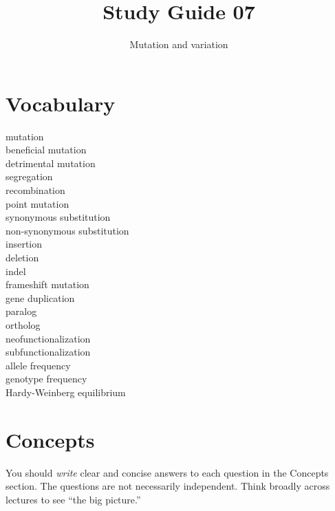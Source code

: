 \documentclass[letterpaper]{tufte-handout}
\title{Study Guide 07\hfill}
\author{Mutation and variation}
\date{} %
\begin{document}
\maketitle	%

\section{Vocabulary}

\begin{multicols}{2}
mutation \\
beneficial mutation \\
detrimental mutation \\
segregation \\
recombination \\
point mutation \\
synonymous substitution \\
non-synonymous substitution \\
insertion \\
deletion \\
indel \\
frameshift mutation \\
gene duplication \\
paralog \\
ortholog \\
neofunctionalization \\
subfunctionalization \\
allele frequency \\
genotype frequency \\
Hardy-Weinberg equilibrium 
\end{multicols}


\section{Concepts}

You should \emph{write} clear and concise answers to each question in the Concepts section.  The questions are not necessarily independent.  Think broadly across lectures to see ``the big picture.'' 
\end{document}

